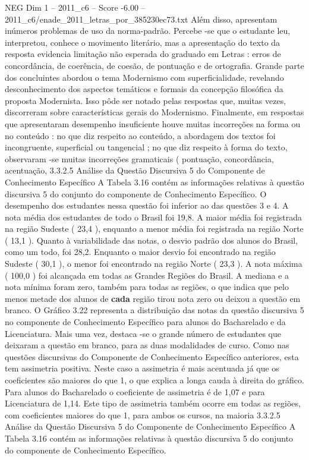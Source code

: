 \begin{textsample}{NEG Dim 1 – 2011\_c6 – Score -6.00 – 2011\_c6/enade\_2011\_letras\_por\_385230ec73.txt}
Além disso, apresentam inúmeros problemas de uso da norma-padrão.
Percebe -se que o estudante leu, interpretou, conhece o movimento literário, mas a apresentação do texto da resposta evidencia limitação não esperada do graduado em Letras : erros de concordância, de coerência, de coesão, de pontuação e de ortografia.
Grande parte dos concluintes abordou o tema Modernismo com superficialidade, revelando desconhecimento dos aspectos temáticos e formais da concepção filosófica da proposta Modernista.
Isso pôde ser notado pelas respostas que, muitas vezes, discorreram sobre características gerais do Modernismo.
Finalmente, em respostas que apresentaram desempenho insuficiente houve muitas incorreções na forma ou no conteúdo : no que diz respeito ao conteúdo, a abordagem dos textos foi incongruente, superficial ou tangencial ; no que diz respeito à forma do texto, observaram -se muitas incorreções gramaticais ( pontuação, concordância, acentuação, 3.3.2.5 Análise da Questão Discursiva 5 do Componente de Conhecimento Específico A Tabela 3.16 contém as informações relativas à questão discursiva 5 do conjunto do componente de Conhecimento Específico.
O desempenho dos estudantes nessa questão foi inferior ao das questões 3 e 4.
A nota média dos estudantes de todo o Brasil foi 19,8.
A maior média foi registrada na região Sudeste ( 23,4 ), enquanto a menor média foi registrada na região Norte ( 13,1 ).
Quanto à variabilidade das notas, o desvio padrão dos alunos do Brasil, como um todo, foi 28,2.
Enquanto o maior desvio foi encontrado na região Sudeste ( 30,1 ), o menor foi encontrado na região Norte ( 23,3 ).
A nota máxima ( 100,0 ) foi alcançada em todas as Grandes Regiões do Brasil.
A mediana e a nota mínima foram zero, também para todas as regiões, o que indica que pelo menos metade dos alunos de \textbf{cada} região tirou nota zero ou deixou a questão em branco.
O Gráfico 3.22 representa a distribuição das notas da questão discursiva 5 no componente de Conhecimento Específico para alunos do Bacharelado e da Licenciatura.
Mais uma vez, destaca -se o grande número de estudantes que deixaram a questão em branco, para as duas modalidades de curso.
Como nas questões discursivas do Componente de Conhecimento Específico anteriores, esta tem assimetria positiva.
Neste caso a assimetria é mais acentuada já que os coeficientes são maiores do que 1, o que explica a longa cauda à direita do gráfico.
Para alunos do Bacharelado o coeficiente de assimetria é de 1,07 e para Licenciatura de 1,14.
Este tipo de assimetria também ocorre em todas as regiões, com coeficientes maiores do que 1, para ambos os cursos, na maioria 3.3.2.5 Análise da Questão Discursiva 5 do Componente de Conhecimento Específico A Tabela 3.16 contém as informações relativas à questão discursiva 5 do conjunto do componente de Conhecimento Específico.

\end{textsample}
